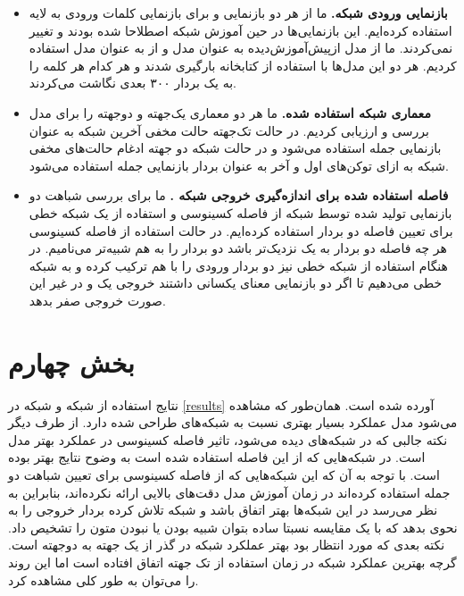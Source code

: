 \documentclass[12pt, a4paper]{book}
\begin{document}
\begin{itemize}
    \item \textbf{بازنمایی ورودی شبکه.} ما از هر دو بازنمایی  و  برای
    بازنمایی کلمات ورودی به لایه  استفاده کرده‌ایم. این بازنمایی‌ها در حین آموزش شبکه اصطلاحا
     شده بودند و تغییر نمی‌کردند.
     ما از مدل ازپیش‌آموزش‌دیده 
    به عنوان مدل  و از  به عنوان مدل 
    استفاده کردیم. هر دو این مدل‌ها با استفاده از کتابخانه  بارگیری شدند و هر کدام هر کلمه را به یک بردار
    ۳۰۰ بعدی نگاشت می‌کردند.
    \item \textbf{معماری شبکه  استفاده شده.} ما هر دو معماری یک‌جهته و دوجهته را برای مدل
     بررسی و ارزیابی کردیم. در حالت تک‌جهته حالت مخفی آخرین شبکه  به عنوان بازنمایی جمله استفاده
    می‌شود و در حالت شبکه  دو جهته ادغام حالت‌های مخفی شبکه  به ازای توکن‌های اول و آخر
    به عنوان بردار بازنمایی جمله استفاده می‌شود.
    \item \textbf{فاصله استفاده شده برای اندازه‌گیری خروجی شبکه .} ما برای بررسی شباهت دو بازنمایی
    تولید شده توسط شبکه  از فاصله کسینوسی و استفاده از یک شبکه خطی برای تعیین فاصله دو بردار استفاده
    کرده‌ایم. در حالت استفاده از فاصله کسینوسی هر چه فاصله دو بردار به یک نزدیک‌تر باشد دو بردار‌ را به
    هم شبیه‌تر می‌نامیم. در هنگام استفاده از شبکه خطی نیز دو بردار ورودی را با هم ترکیب کرده و به شبکه خطی
    می‌دهیم تا اگر دو بازنمایی معنای یکسانی داشتند خروجی یک و در غیر این صورت خروجی صفر بدهد.
\end{itemize}

\section*{بخش چهارم}

نتایج استفاده از شبکه  و شبکه  در \autoref{results} آورده شده است.
همان‌طور که مشاهده می‌شود مدل  عملکرد بسیار بهتری نسبت به شبکه‌های  طراحی شده دارد.
از طرف دیگر نکته جالبی که در شبکه‌های  دیده می‌شود، تاثیر فاصله کسینوسی در عملکرد بهتر مدل است.
در شبکه‌هایی که از این فاصله استفاده شده است به وضوح نتایج بهتر بوده است. با توجه به آن که این شبکه‌هایی
که از فاصله کسینوسی برای تعیین شباهت دو جمله استفاده کرده‌اند در زمان آموزش مدل دقت‌های بالایی ارائه نکرده‌اند،
بنابراین به نظر می‌رسد در این شبکه‌ها  بهتر اتفاق باشد و شبکه  تلاش کرده بردار
خروجی را به نحوی بدهد که با یک مقایسه نسبتا ساده بتوان شبیه بودن یا نبودن متون را تشخیص داد.
نکته بعدی که مورد انتظار بود بهتر عملکرد شبکه  در گذر از یک جهته به دو‌جهته است.
گرچه بهترین عملکرد شبکه  در زمان استفاده از  تک جهته اتفاق افتاده است اما
این روند را می‌توان به طور کلی مشاهده کرد.
\end{document}
